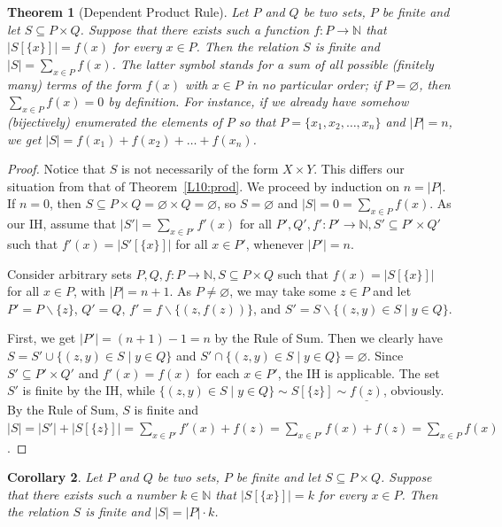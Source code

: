 \documentclass[12pt,notitlepage]{article}
\theoremstyle{plain}
\newtheorem{thm}{Theorem}[section]
\newtheorem{corr}[thm]{Corollary}
\theoremstyle{definition}
\theoremstyle{plain}
\newcommand{\N}{\mathbb{N}}
\newcommand{\sbs}{\subseteq}
\renewcommand{\setminus}{\smallsetminus}
\newcommand{\void}{\varnothing}
\newcommand{\ul}[1]{\underline{#1}}
\newcommand{\1}{\mathbf{1}}
\newcommand{\0}{\mathbf{0}}
\begin{document}
\begin{thm}[Dependent Product Rule]
Let $P$ and $Q$ be two sets, $P$ be finite and let $S \sbs P \times Q$. Suppose that there exists such a function $f\colon P \to \N$ that $|S[\{x\}]| = f(x)$ for every $x \in P$. Then the relation $S$ is finite and $|S| = \sum_{x \in P} f(x)$. The latter symbol stands for a sum of all possible (finitely many) terms of the form $f(x)$ with $x \in P$ in no particular order; if $P = \void$, then $\sum_{x \in P} f(x) = 0$ by definition. For instance, if we already have somehow (bijectively) enumerated the elements of $P$ so that $P = \{x_1, x_2, \ldots, x_n\}$ and $|P| = n$, we get $|S| = f(x_1) + f(x_2) + \ldots + f(x_n)$.
\end{thm}
\begin{proof}
Notice that $S$ is not necessarily of the form $X \times Y$. This differs our situation from that of Theorem~\ref{L10:prod}. We proceed by induction on $n = |P|$. If $n = 0$, then $S \sbs P \times Q = \void \times Q = \void$, so $S = \void$  and $|S| = 0 = \sum_{x \in P} f(x)$. As our IH, assume that $|S'| = \sum_{x \in P'} f'(x)$ for all $P', Q', f'\colon P' \to \N, S' \sbs P' \times Q'$ such that $f'(x) = |S'[\{x\}]|$ for all $x \in P'$, whenever $|P'| = n$.

Consider arbitrary sets $P, Q, f\colon P \to \N, S \sbs P \times Q$ such that $f(x) = |S[\{x\}]|$ for all $x \in P$, with $|P| = n + 1$. As $P \neq \void$, we may take some $z \in P$ and let $P' = P \setminus \{z\}$, $Q' = Q$, $f' = f \setminus \{(z, f(z))\}$, and $S' = S \setminus \{ (z, y) \in S \mid y \in Q \}$.

First, we get $|P'| = (n + 1) - 1 = n$ by the Rule of Sum. Then we clearly have $S = S' \cup \{ (z, y) \in S \mid y \in Q \}$ and $S' \cap \{ (z, y) \in S \mid y \in Q \} = \void$. Since $S' \sbs P' \times Q'$ and $f'(x) = f(x)$ for each $x \in P'$, the IH is applicable. The set $S'$ is finite by the IH, while $\{ (z, y) \in S \mid y \in Q \} \sim S[\{z\}] \sim \ul{f(z)}$, obviously. By the Rule of Sum, $S$ is finite and $|S| = |S'| + |S[\{z\}]| = \sum_{x \in P'} f'(x) + f(z) = \sum_{x \in P'} f(x) + f(z) = \sum_{x \in P} f(x)$.
\end{proof}

\begin{corr}\label{L10:dep_simpl}
Let $P$ and $Q$ be two sets, $P$ be finite and let $S \sbs P \times Q$. Suppose that there exists such a number $k \in \N$ that $|S[\{x\}]| = k$ for every $x \in P$. Then the relation $S$ is finite and $|S| = |P|\cdot k$.
\end{corr}
\end{document}
